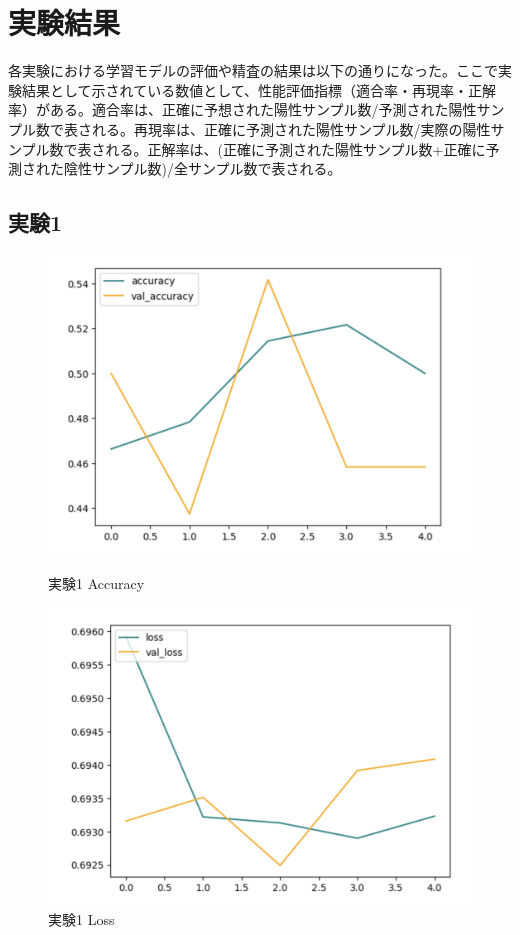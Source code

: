 \documentclass[a4paper, 11pt, titlepage]{jsarticle}
\begin{document}
\section{実験結果}
各実験における学習モデルの評価や精査の結果は以下の通りになった。ここで実験結果として示されている数値として、性能評価指標（適合率・再現率・正解率）がある。適合率は、正確に予想された陽性サンプル数/予測された陽性サンプル数で表される。再現率は、正確に予測された陽性サンプル数/実際の陽性サンプル数で表される。正解率は、(正確に予測された陽性サンプル数+正確に予測された陰性サンプル数)/全サンプル数で表される。
\subsection{実験1}

\clearpage

\begin{figure}[htbp]
  \begin{minipage}[b]{0.45\linewidth}
    \centering
    \includegraphics[keepaspectratio, scale=0.32]{ex1_acc.png}
    \caption{実験1 Accuracy}
  \end{minipage}
  \begin{minipage}[b]{0.45\linewidth}
    \centering
    \includegraphics[keepaspectratio, scale=0.32]{ex1_loss.png}
    \caption{実験1 Loss}
  \end{minipage}
\end{figure}
\end{document}
